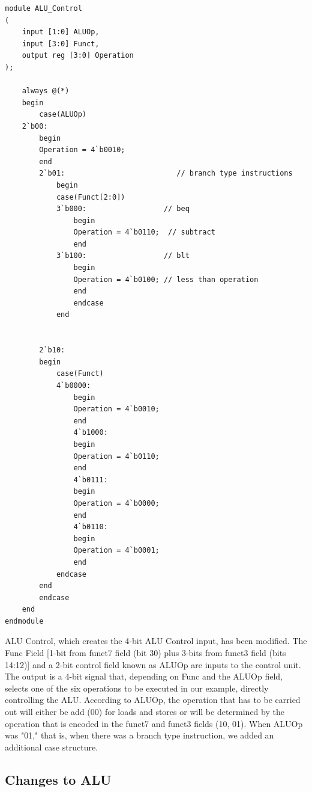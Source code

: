\documentclass{article}
\begin{document}
\begin{lstlisting}[caption={Changes to ALU Control Unit}, captionpos=b, language=RISC-V]
module ALU_Control
(
    input [1:0] ALUOp, 
    input [3:0] Funct,
    output reg [3:0] Operation
);

    always @(*)
    begin
        case(ALUOp)
    2`b00:
        begin
        Operation = 4`b0010;
        end
        2`b01:                          // branch type instructions
            begin
            case(Funct[2:0])
            3`b000:                  // beq
                begin
                Operation = 4`b0110;  // subtract
                end
            3`b100:                  // blt
                begin
                Operation = 4`b0100; // less than operation 
                end
                endcase
            end
            
        
        2`b10:
        begin
            case(Funct)
            4`b0000: 
                begin
                Operation = 4`b0010;
                end
                4`b1000:
                begin
                Operation = 4`b0110;
                end
                4`b0111:
                begin
                Operation = 4`b0000;
                end
                4`b0110:
                begin
                Operation = 4`b0001;
                end
            endcase
        end
        endcase
    end    
endmodule
\end{lstlisting}

ALU Control, which creates the 4-bit ALU Control input, has been modified. The Func Field [1-bit from funct7 field (bit 30) plus 3-bits from funct3 field (bits 14:12)] and a 2-bit control field known as ALUOp are inputs to the control unit. The output is a 4-bit signal that, depending on Func and the ALUOp field, selects one of the six operations to be executed in our example, directly controlling the ALU. According to ALUOp, the operation that has to be carried out will either be add (00) for loads and stores or will be determined by the operation that is encoded in the funct7 and funct3 fields (10, 01). When ALUOp was "01," that is, when there was a branch type instruction, we added an additional case structure.

\subsection{Changes to ALU}
\end{document}

